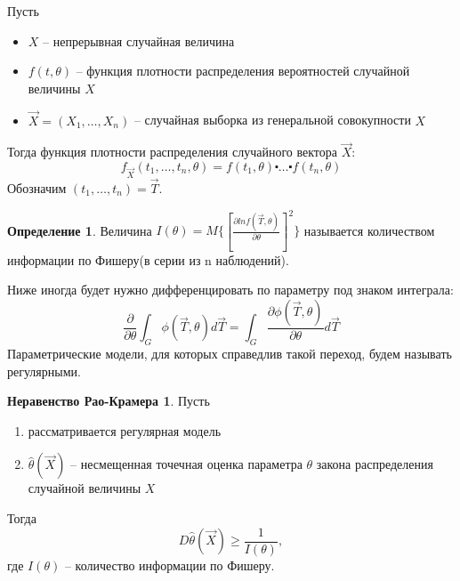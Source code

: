 \documentclass[a4paper, 12pt]{article}
\theoremstyle{definition}
\newtheorem{definition}{Определение}[section]
\theoremstyle{leads}
\theoremstyle{example}
\begin{document}
Пусть 
\begin{itemize}
	\item $X$ -- непрерывная случайная величина
	\item $f(t, \theta)$ -- функция плотности распределения вероятностей случайной величины $X$
	\item $\vec{X} = (X_1, \dots, X_n)$ -- случайная выборка из генеральной совокупности $X$
\end{itemize}
Тогда функция плотности распределения случайного вектора $\vec{X}$:
\begin{displaymath}
	f_{\vec{X}}(t_1, \dots, t_n, \theta) = f(t_1, \theta) \centerdot\dots \centerdot f(t_n, \theta)
\end{displaymath}
Обозначим $(t_1, \dots, t_n) = \vec{T}$.

\begin{definition}
	Величина $I(\theta) = M\{[\frac{\partial ln f(\vec{T}, \theta)}{\partial \theta}]^2\}$ называется количеством информации по Фишеру(в серии из n наблюдений).
\end{definition}
\begin{remark}
	Ниже иногда будет нужно дифференцировать по параметру под знаком интеграла:
	\begin{displaymath}
	  \frac{\partial}{\partial \theta} \int_{G}{} \phi(\vec{T}, \theta) d\vec{T} = \int_{G}{} \frac{\partial \phi(\vec{T}, \theta)}{\partial \theta} d \vec{T}
	\end{displaymath}
	Параметрические модели, для которых справедлив такой переход, будем называть регулярными.
\end{remark}

\newtheorem*{Rao-Kramer}{Неравенство Рао-Крамера}
\begin{Rao-Kramer}
Пусть 
\begin{enumerate}
	\item рассматривается регулярная модель
	\item $\hat \theta (\vec{X})$ -- несмещенная точечная оценка параметра $\theta$ закона распределения случайной величины $X$ 
\end{enumerate}
Тогда 
\begin{displaymath}
	D \hat{\theta} (\vec{X}) \geq \frac{1}{I(\theta)},
\end{displaymath}
где $I(\theta)$ -- количество информации по Фишеру.
\end{Rao-Kramer}
\end{document}
